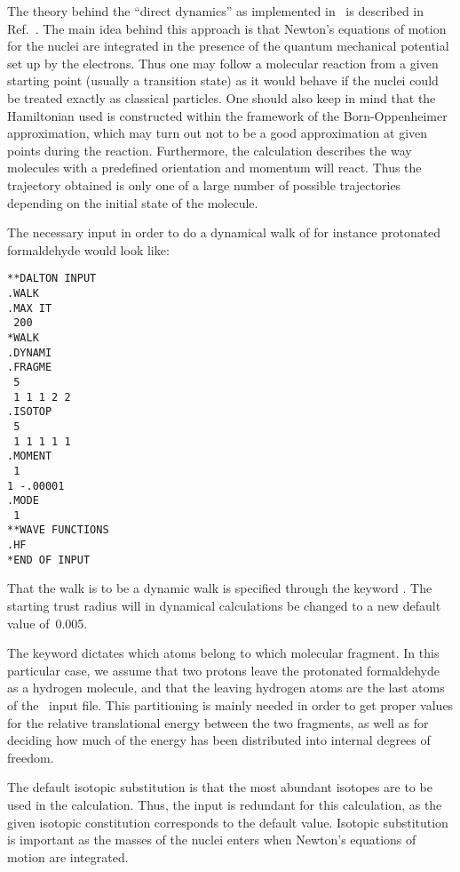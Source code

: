 The theory behind the ``direct dynamics'' as implemented in \siraba\ is
described in Ref.~\cite{theuhjajcpl173}. The
main idea behind this
approach is that Newton's equations of motion for the nuclei are
integrated in the presence of the quantum mechanical potential set up
by the electrons. Thus one may follow a molecular reaction from a
given starting point (usually a transition state) as it would behave
if the nuclei could be treated exactly as classical particles. One
should also keep in mind that the Hamiltonian used is constructed within
the framework of the Born-Oppenheimer approximation, which may turn
out not to be a good approximation at given points during the
reaction. Furthermore, the calculation describes the way molecules
with a predefined orientation and momentum will react. Thus
the trajectory obtained is only one of a large number of
possible trajectories depending on the initial state of the molecule.

The necessary input in order to do a dynamical walk of for instance
protonated formaldehyde would look like:

\begin{verbatim}
**DALTON INPUT
.WALK
.MAX IT
 200
*WALK
.DYNAMI
.FRAGME
 5
 1 1 1 2 2
.ISOTOP
 5
 1 1 1 1 1
.MOMENT
 1
1 -.00001
.MODE
 1
**WAVE FUNCTIONS
.HF
*END OF INPUT
\end{verbatim}

That the walk is to
be a dynamic walk is specified through the keyword . The
starting trust radius will in dynamical calculations be changed to a
new default value of~0.005.

The keyword  dictates which atoms belong to which
molecular fragment. In this particular
case, we assume that two
protons leave the protonated formaldehyde as a
hydrogen molecule, and
that the leaving hydrogen atoms are the last atoms of the \mol\ input
file. This partitioning is mainly needed in order to get
proper values for the relative translational energy between the two
fragments, as well as for deciding how much of the energy has been
distributed into internal degrees of freedom.

The default isotopic substitution is that the most abundant
isotopes are to be used in the calculation. Thus, the input
 is redundant for this calculation, as the given
isotopic constitution corresponds to the default value. Isotopic
substitution is important as the masses of the nuclei enters when
Newton's equations of motion are integrated.

